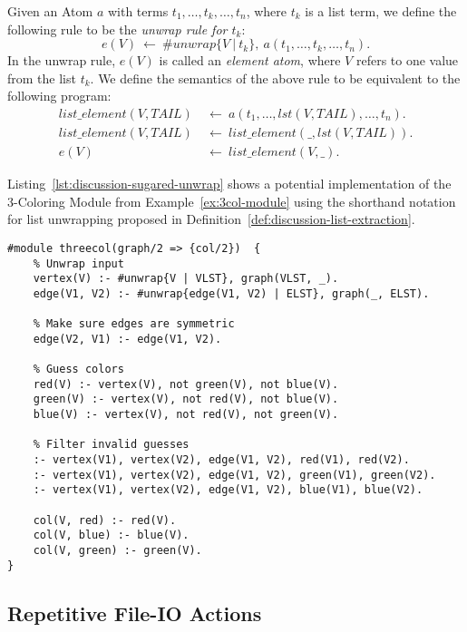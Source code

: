 \begin{definition}
\label{def:discussion-list-extraction}
Given an Atom $a$ with terms $t_1,\ldots,t_k,\ldots,t_n$, where $t_k$ is a list term, we define the following rule to be the \emph{unwrap rule for $t_k$}:
\[
	e(V)~\leftarrow~\#unwrap\{ V~|~t_k \},~a(t_1,\ldots,t_k,\ldots,t_n).
\]
In the unwrap rule, $e(V)$ is called an \emph{element atom}, where $V$ refers to one value from the list $t_k$.
We define the semantics of the above rule to be equivalent to the following program:
\begin{align*}
	\mathit{list\_element}(V,\mathit{TAIL})~&\leftarrow~a(t_1,\ldots,\mathit{lst}(V,\mathit{TAIL}),\ldots,t_n).\\
	\mathit{list\_element}(V,\mathit{TAIL})~&\leftarrow~\mathit{list\_element}(\_,\mathit{lst}(V,\mathit{TAIL})).\\
	e(V)~&\leftarrow~\mathit{list\_element}(V,\_).
\end{align*}	
\end{definition}

Listing~\ref{lst:discussion-sugared-unwrap} shows a potential implementation of the 3-Coloring Module from Example~\ref{ex:3col-module} using the shorthand notation for list unwrapping proposed in Definition~\ref{def:discussion-list-extraction}.

\begin{lstlisting}[style=asp-code, label={lst:discussion-sugared-unwrap}, caption={3-Coloring Module with shorthand list unwrapping rules.}]
#module threecol(graph/2 => {col/2})  {
	% Unwrap input
	vertex(V) :- #unwrap{V | VLST}, graph(VLST, _).
	edge(V1, V2) :- #unwrap{edge(V1, V2) | ELST}, graph(_, ELST).

	% Make sure edges are symmetric
	edge(V2, V1) :- edge(V1, V2).

	% Guess colors
	red(V) :- vertex(V), not green(V), not blue(V).
	green(V) :- vertex(V), not red(V), not blue(V).
	blue(V) :- vertex(V), not red(V), not green(V).

	% Filter invalid guesses
	:- vertex(V1), vertex(V2), edge(V1, V2), red(V1), red(V2).
	:- vertex(V1), vertex(V2), edge(V1, V2), green(V1), green(V2).
	:- vertex(V1), vertex(V2), edge(V1, V2), blue(V1), blue(V2).

	col(V, red) :- red(V).
	col(V, blue) :- blue(V).
	col(V, green) :- green(V).
}
\end{lstlisting}	

\subsection{Repetitive File-IO Actions}

